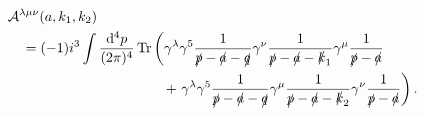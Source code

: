 \begin{equation}
  \label{eq:amplitude-shift}
  \begin{split}
    &\mathcal{A}^{\lambda \mu \nu}(a, k_1, k_2)\\
    &\quad=
  (-1) i^3 \int \frac{\mathrm{d}^4p}{(2\pi)^{4}}
  \begin{multlined}[t]
    \Tr \left(
      \gamma ^{\lambda } \gamma ^5 \frac{1}{\slashed{p} - \slashed{a} - \slashed{q}} \gamma ^{\nu } \frac{1}{\slashed{p} - \slashed{a}- \slashed{k}_{1}} \gamma ^{\mu } \frac{1}{\slashed{p} - \slashed{a}} \right.\\
   \quad +
    \left. \gamma ^{\lambda }\gamma ^5 \frac{1}{\slashed{p} - \slashed{a}- \slashed{q}} \gamma ^{\mu } \frac{1}{\slashed{p} - \slashed{a} - \slashed{k}_2} \gamma ^{\nu } \frac{1}{\slashed{p} - \slashed{a}}
    \right).
  \end{multlined}
  \end{split}
\end{equation}

